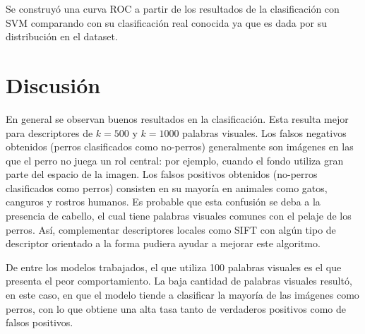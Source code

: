 \documentclass[12pt]{article}
\begin{document}
Se construyó una curva ROC a partir de los resultados de la clasificación con SVM comparando con su clasificación real conocida ya que es dada por su distribución en el dataset.

\section{Discusión}

En general se observan buenos resultados en la clasificación. Esta resulta mejor
para descriptores de $k=500$ y $k=1000$ palabras visuales.  Los falsos negativos
obtenidos (perros clasificados como no-perros) generalmente son imágenes en las
que el perro no juega un rol central: por ejemplo, cuando el fondo utiliza gran parte del
espacio de la imagen. Los falsos positivos obtenidos (no-perros clasificados
como perros) consisten en su mayoría en animales como gatos, canguros y rostros
humanos. Es probable que esta confusión se deba a la presencia de cabello, el
cual tiene palabras visuales comunes con el pelaje de los perros. Así,
complementar descriptores locales como SIFT con algún tipo de descriptor
orientado a la forma pudiera ayudar a mejorar este algoritmo.

De entre los modelos trabajados, el que utiliza 100 palabras visuales es el que
presenta el peor comportamiento. La baja cantidad de palabras visuales resultó,
en este caso, en que el modelo tiende a clasificar la mayoría de las imágenes
como perros, con lo que obtiene una alta tasa tanto de verdaderos positivos como
de falsos positivos.
\end{document}
